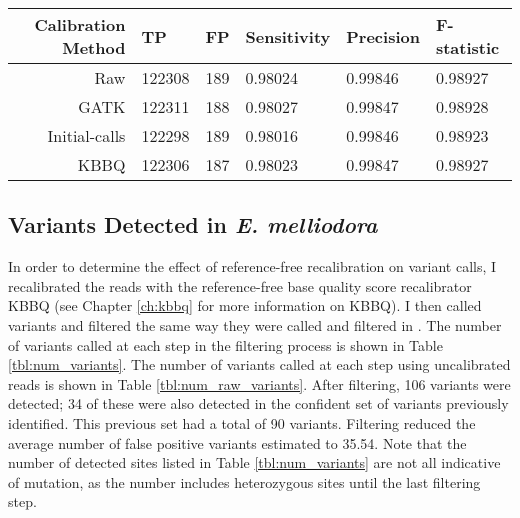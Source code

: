 \begin{table}
\centering
\begin{tabular}{r l l l l l}
\toprule
Calibration Method & TP & FP & Sensitivity & Precision & F-statistic \\
\midrule
Raw & 122308 & 189 & 0.98024 & 0.99846 & 0.98927\\ 
GATK & 122311 & 188 & 0.98027 & 0.99847 & 0.98928\\ 
Initial-calls & 122298 & 189 & 0.98016 & 0.99846 & 0.98923\\ 
KBBQ & 122306 & 187 & 0.98023 & 0.99847 & 0.98927\\ 
\bottomrule
\end{tabular}
\label{table:sim_summary}
\end{table}



\subsection{Variants Detected in \textit{E. melliodora}}

In order to determine the effect of reference-free recalibration on variant calls, I recalibrated the reads with the reference-free base quality score recalibrator KBBQ (see Chapter \ref{ch:kbbq} for more information on KBBQ). I then called variants and filtered the same way they were called and filtered in \cite{orr_phylogenomic_2020}. The number of variants called at each step in the filtering process is shown in Table \ref{tbl:num_variants}. The number of variants called at each step using uncalibrated reads is shown in Table \ref{tbl:num_raw_variants}. After filtering, 106 variants were detected; 34 of these were also detected in the confident set of variants previously identified. This previous set had a total of 90 variants. Filtering reduced the average number of false positive variants estimated to 35.54. Note that the number of detected sites listed in Table \ref{tbl:num_variants} are not all indicative of mutation, as the number includes heterozygous sites until the last filtering step.

